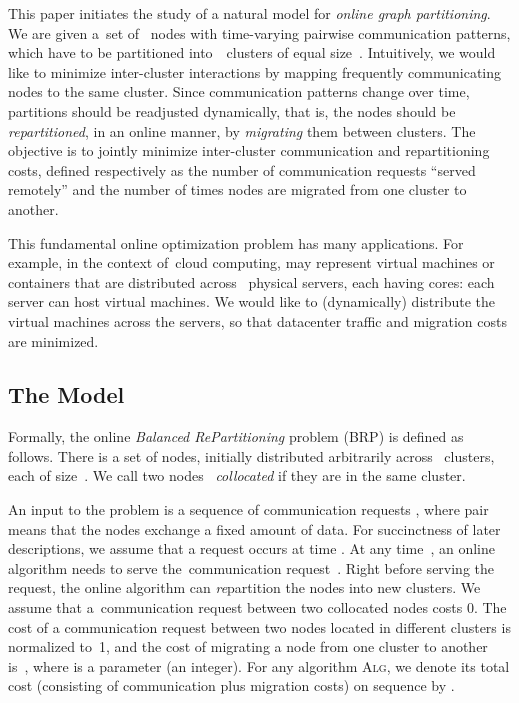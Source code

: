 \documentclass{siamart190516}
\newcommand{\ALG}{\textsc{Alg}\xspace}
\begin{document}
This paper initiates the study of a natural model for \emph{online graph
partitioning}. We are given a~set of~ nodes with time-varying pairwise
communication patterns, which have to be partitioned into~~clusters of
equal size~. Intuitively, we would like to minimize inter-cluster
interactions by mapping frequently communicating nodes to the same cluster.
Since communication patterns change over time, partitions should be
readjusted dynamically, that is, the nodes should be \emph{repartitioned}, in
an online manner, by \emph{migrating} them between clusters. The objective is
to jointly minimize inter-cluster communication and repartitioning costs,
defined respectively as the number of communication requests ``served
remotely'' and the number of times nodes are migrated from one cluster to
another.

This fundamental online optimization problem has many applications. For
example, in the context of~cloud computing,  may represent virtual machines
or containers that are distributed across~ physical servers, each having
 cores: each server can host  virtual machines. We would like to
(dynamically) distribute the virtual machines across the servers, so that
datacenter traffic and migration costs are minimized.


\subsection{The Model}

Formally, the online \emph{Balanced RePartitioning} problem (BRP) is defined as
follows. There is a set of  nodes, initially distributed arbitrarily
across ~clusters, each of size~. We call two nodes~
\emph{collocated} if they are in the same cluster.

An input to the problem is a sequence of communication requests  , where pair  means that
the nodes  exchange a fixed amount of data. For succinctness of later descriptions,
we assume that a request  occurs at time . At any time~, an online algorithm needs to serve the~communication
request~. Right before serving the request, the online algorithm
can \emph{re}partition the nodes into new clusters. We assume that
a~communication request between two collocated nodes costs 0. The cost of a
communication request between two nodes located in different clusters is
normalized to~1, and the cost of migrating a node from one cluster to another
is~, where  is a parameter (an integer). For any
algorithm \ALG, we denote its total cost (consisting of communication plus
migration costs) on sequence  by .
\end{document}
